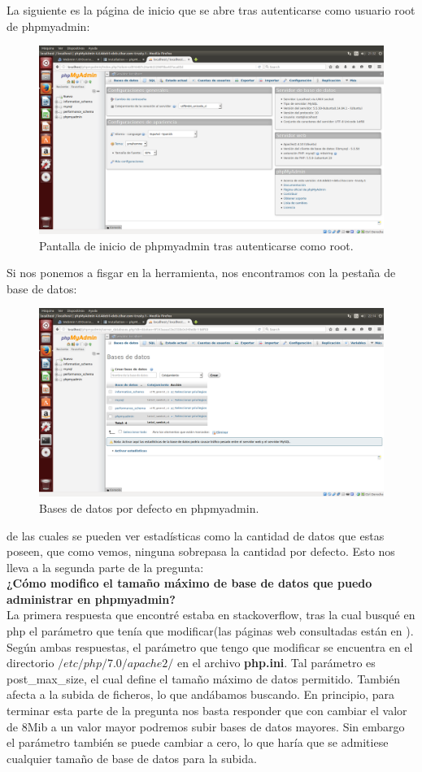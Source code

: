 \begin{itemize}
	La siguiente es la página de inicio que se abre tras autenticarse como usuario root de phpmyadmin:\\
	
	\begin{figure}[H]
		\centering
		\includegraphics[width=0.7\linewidth]{PHpmyadminInicio}
		\caption[PHPmyadmin inicio]{Pantalla de inicio de phpmyadmin tras autenticarse como root.}
		\label{fig:PHpmyadminInicio}
	\end{figure}
	
	Si nos ponemos a fisgar en la herramienta, nos encontramos con la pestaña de base de datos:\\
	
	\begin{figure}[H]
		\centering
		\includegraphics[width=0.7\linewidth]{PHPMyadminDataBases}
		\caption[PHPmyadmin Data bases]{Bases de datos por defecto en phpmyadmin.}
		\label{fig:PHPMyadminDataBases}
	\end{figure}
	
	de las cuales se pueden ver estadísticas como la cantidad de datos que estas poseen, que como vemos, ninguna sobrepasa la cantidad por defecto. Esto nos lleva a la segunda parte de la pregunta:\\
	
	\textbf{¿Cómo modifico el tamaño máximo de base de datos que puedo administrar en phpmyadmin?}\\
	
	La primera respuesta que encontré estaba en stackoverflow, tras la cual busqué en php el parámetro que tenía que modificar(las páginas web consultadas están en \cite{phpMaxSize}). Según ambas respuestas, el parámetro que tengo que modificar se encuentra en el directorio $/etc/php/7.0/apache2/$ en el archivo \textbf{php.ini}. Tal parámetro es post\_max\_size, el cual define el tamaño máximo de datos permitido. También afecta a la subida de ficheros, lo que andábamos buscando. En principio, para terminar esta parte de la pregunta nos basta responder que con cambiar el valor de 8Mib a un valor mayor podremos subir bases de datos mayores. Sin embargo el parámetro también se puede cambiar a cero, lo que haría que se admitiese cualquier tamaño de base de datos para la subida.


\end{itemize}
